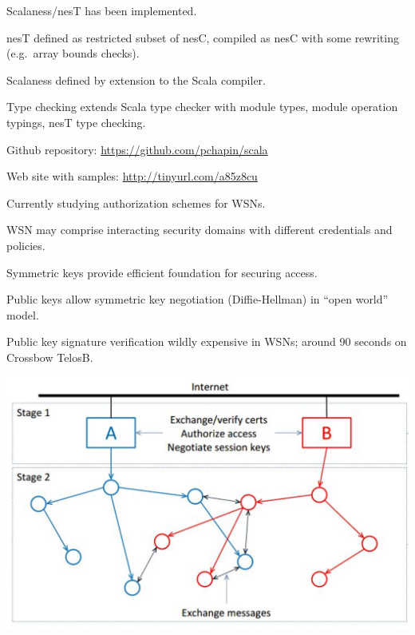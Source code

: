 
Scalaness/nesT has been implemented.
\begin{citemize}
\item nesT defined as restricted subset of nesC, compiled as nesC with some rewriting
  (e.g.~array bounds checks).
\item Scalaness defined by extension to the Scala compiler.
\item Type checking extends Scala type checker with module types, module operation typings, nesT
  type checking.
\end{citemize}
Github repository: \url{https://github.com/pchapin/scala}

Web site with samples: \url{http://tinyurl.com/a85z8cu}
\stopslide


Currently studying authorization schemes for WSNs.
\begin{citemize}
\item WSN may comprise interacting security domains with different credentials and policies.
\item Symmetric keys provide efficient foundation for securing access.
\item Public keys allow symmetric key negotiation (Diffie-Hellman) in ``open world'' model.
\end{citemize}
Public key signature verification wildly expensive in WSNs; around 90 seconds on Crossbow
TelosB.

\stopslide


\hspace*{.6in}\includegraphics{spartanrpc}

